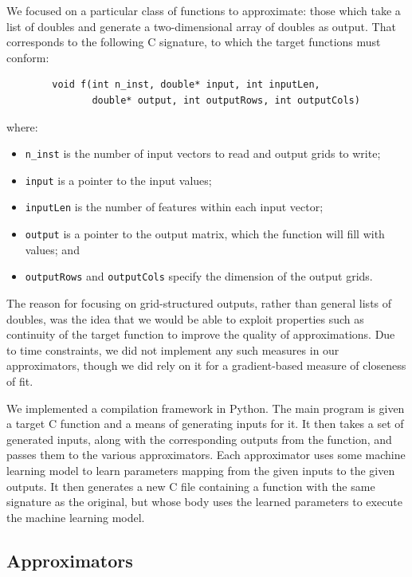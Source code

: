 \documentclass{article}
\begin{document}
We focused on a particular class of functions to approximate: those which take a list of doubles and generate a two-dimensional array of doubles as output. That corresponds to the following C signature, to which the target functions must conform:
\begin{center}
\begin{verbatim}
        void f(int n_inst, double* input, int inputLen,
               double* output, int outputRows, int outputCols)
\end{verbatim}
where:
\begin{itemize}
\item {\tt n\_inst} is the number of input vectors to read and output grids to write;
\item {\tt input} is a pointer to the input values;
\item {\tt inputLen} is the number of features within each input vector;
\item {\tt output} is a pointer to the output matrix, which the function will fill with values; and
\item {\tt outputRows} and {\tt outputCols} specify the dimension of the output grids.
\end{itemize}
\end{center}

The reason for focusing on grid-structured outputs, rather than general lists of doubles, was the idea that we would be able to exploit properties such as continuity of the target function to improve the quality of approximations. Due to time constraints, we did not implement any such measures in our approximators, though we did rely on it for a gradient-based measure of closeness of fit.

We implemented a compilation framework in Python. The main program is given a target C function and a means of generating inputs for it. It then takes a set of generated inputs, along with the corresponding outputs from the function, and passes them to the various approximators. Each approximator uses some machine learning model to learn parameters mapping from the given inputs to the given outputs. It then generates a new C file containing a function with the same signature as the original, but whose body uses the learned parameters to execute the machine learning model.

\subsection{Approximators}
\end{document}
